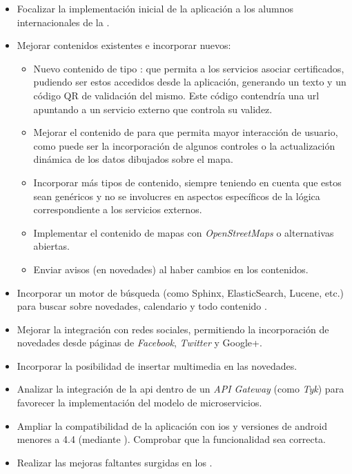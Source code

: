 \begin{itemize}
\item Focalizar la implementación inicial de la aplicación a los alumnos internacionales de la \unlp{}.
\item Mejorar contenidos existentes e incorporar nuevos:
\begin{itemize}
\item Nuevo contenido de tipo : que permita a los servicios asociar certificados, pudiendo ser estos accedidos desde la aplicación, generando un texto y un código QR de validación del mismo. Este código contendría una \gls{url} apuntando a un servicio externo que controla su validez. 
\item Mejorar el contenido de  para que permita mayor interacción de usuario, como puede ser la incorporación de algunos controles o la actualización dinámica de los datos dibujados sobre el mapa.
\item Incorporar más tipos de contenido, siempre teniendo en cuenta que estos sean genéricos y no se involucres en aspectos específicos de la lógica correspondiente a los servicios externos.
\item Implementar el contenido de mapas con \textit{OpenStreetMaps} o alternativas abiertas.
\item Enviar avisos (en novedades) al haber cambios en los contenidos.
\end{itemize}
\item Incorporar un motor de búsqueda (como Sphinx, ElasticSearch, Lucene, etc.) para buscar sobre novedades, calendario y todo contenido .
\item Mejorar la integración con redes sociales, permitiendo la incorporación de novedades desde páginas de \textit{Facebook}, \textit{Twitter} y Google+.
\item Incorporar la posibilidad de insertar multimedia en las novedades.
\item Analizar la integración de la \gls{api} dentro de un \textit{API Gateway} (como \textit{Tyk}) para favorecer la implementación del modelo de microservicios.
\item Ampliar la compatibilidad de la aplicación con \gls{ios} y versiones de \gls{android} menores a 4.4 (mediante ). Comprobar que la funcionalidad sea correcta.
\item Realizar las mejoras faltantes surgidas en los .
\end{itemize}

